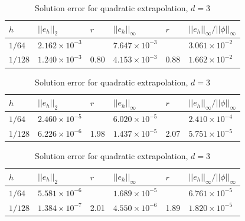 \begin{table}[htb]
  \begin{center}
    \begin{tabular}{llllll}
      \hline
      $h$ & $\vert\vert e_h \vert\vert_2$ & $r$ & $\vert\vert e_h
      \vert\vert_\infty$ & $r$ & $\vert\vert e_h \vert\vert_\infty /
      \vert\vert \phi \vert\vert_\infty$ \\ [0.2ex] \hline 
      \vphantom{\rule{0pt}{2.7ex}}
      $1/64$  & $2.162 \times 10^{-3}$ & & $7.647 \times 10^{-3}$ & &
      $3.061 \times 10^{-2}$ \\ 
      $1/128$ & $1.240 \times 10^{-3}$ & 0.80 & $4.153 \times 10^{-3}$ &
      0.88 & $1.662 \times 10^{-2}$ \\ [0.2ex]
      \hline
    \end{tabular}
    \caption{Solution error for constant extrapolation, $d=3$}
    \label{tbl:rel_error_const}
  \end{center}

  \begin{center}
    \begin{tabular}{llllll}
      \hline
      $h$ & $\vert\vert e_h \vert\vert_2$ & $r$ & $\vert\vert e_h
      \vert\vert_\infty$ & $r$ & $\vert\vert e_h \vert\vert_\infty /
      \vert\vert \phi \vert\vert_\infty$\\ [0.2ex]
      \hline 
      \vphantom{\rule{0pt}{2.7ex}}
      $1/64$  & $2.460 \times 10^{-5}$ & & $6.020 \times 10^{-5}$ & &
      $2.410 \times 10^{-4}$ \\
      $1/128$ & $6.226 \times 10^{-6}$ & 1.98 & $1.437 \times 10^{-5}$ &
      2.07 & $5.751 \times 10^{-5}$ \\ [0.2ex]
      \hline
    \end{tabular}
    \caption{Solution error for linear extrapolation, $d=3$}
    \label{tbl:rel_error_lin}
  \end{center}

  \begin{center}
    \begin{tabular}{llllll}
      \hline
      $h$ & $\vert\vert e_h \vert\vert_2$ & $r$ & $\vert\vert e_h
      \vert\vert_\infty$ & $r$ & $\vert\vert e_h \vert\vert_\infty /
      \vert\vert \phi \vert\vert_\infty$\\ [0.2ex]
      \hline 
      \vphantom{\rule{0pt}{2.7ex}}
      $1/64$  & $5.581 \times 10^{-6}$ & & $1.689 \times 10^{-5}$ & &
      $6.761 \times 10^{-5}$ \\ 
      $1/128$ & $1.384 \times 10^{-7}$ & 2.01 & $4.550 \times 10^{-6}$ &
      1.89 & $1.820 \times 10^{-5}$ \\ [0.2ex]
      \hline
    \end{tabular}
    \caption{Solution error for quadratic extrapolation, $d=3$}
    \label{tbl:rel_error_quad}
  \end{center}
\end{table}

